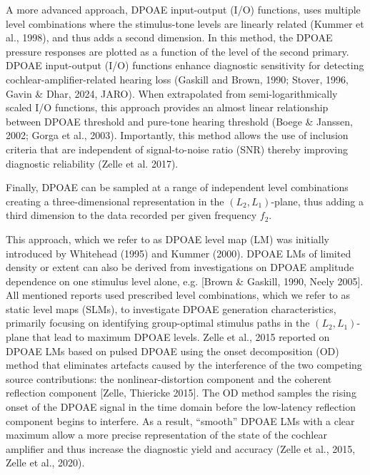 \documentclass[journal,twoside,web]{ieeecolor2}
\begin{document}
A more advanced approach, DPOAE input-output (I/O) functions, uses multiple level combinations where the stimulus-tone levels are linearly related (Kummer et al., 1998), and thus adds a second dimension. In this method, the DPOAE pressure responses are plotted as a function of the level of the second primary. DPOAE input-output (I/O) functions enhance diagnostic sensitivity for detecting cochlear-amplifier-related hearing loss (Gaskill and Brown, 1990; Stover, 1996, Gavin \& Dhar, 2024, JARO). When extrapolated from semi-logarithmically scaled I/O functions, this approach provides an almost linear relationship between DPOAE threshold and pure-tone hearing threshold (Boege \& Janssen, 2002; Gorga et al., 2003). Importantly, this method allows the use of inclusion criteria that are independent of signal-to-noise ratio (SNR) thereby improving diagnostic reliability (Zelle et al. 2017).

Finally, DPOAE can be sampled at a range of independent level combinations creating a three-dimensional representation in the $(L_2, L_1)$-plane, thus adding a third dimension to the data recorded per given frequency $f_2$.
 
This approach, which we refer to as DPOAE level map (LM) was initially introduced by Whitehead (1995) and Kummer (2000). DPOAE LMs of limited density or extent can also be derived from investigations on DPOAE amplitude dependence on one stimulus level alone, e.g. [Brown \& Gaskill, 1990, Neely 2005]. All mentioned reports used prescribed level combinations, which we refer to as static level maps (SLMs), to investigate DPOAE generation characteristics, primarily focusing on identifying group-optimal stimulus paths in the $(L_2, L_1)$-plane that lead to maximum DPOAE levels. Zelle et al., 2015 reported on DPOAE LMs based on pulsed DPOAE using the onset decomposition (OD) method that eliminates artefacts caused by the interference of the two competing source contributions: the nonlinear-distortion component and the coherent reflection component [Zelle, Thiericke 2015]. The OD method samples the rising onset of the DPOAE signal in the time domain before the low-latency reflection component begins to interfere. As a result, “smooth” DPOAE LMs with a clear maximum allow a more precise representation of the state of the cochlear amplifier and thus increase the diagnostic yield and accuracy (Zelle et al., 2015, Zelle et al., 2020).
\end{document}
